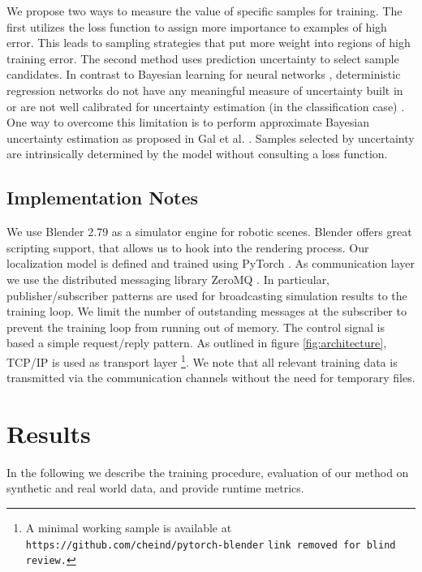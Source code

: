 \documentclass[conference]{IEEEtran}
\begin{document}
    We propose two ways to measure the value of specific samples for training. The first utilizes the loss function to assign more importance to examples of high error. This leads to sampling strategies that put more weight into regions of high training error. The second method uses prediction uncertainty to select sample candidates. In contrast to Bayesian learning for neural networks \cite{neal2012bayesian}, deterministic regression networks do not have any meaningful measure of uncertainty built in or are not well calibrated for uncertainty estimation (in the classification case) \cite{guo2017calibration}. One way to overcome this limitation is to perform approximate Bayesian uncertainty estimation as proposed in Gal et al. \cite{gal2015dropout}. Samples selected by uncertainty are intrinsically determined by the model without consulting a loss function.
    

\subsection{Implementation Notes}
    \label{sec:impl}
    We use Blender 2.79 \cite{blender} as a simulator engine for robotic scenes. Blender offers great scripting support, that allows us to hook into the rendering process. Our localization model is defined and trained using PyTorch \cite{paszke2017automatic}. As communication layer we use the distributed messaging library ZeroMQ \cite{zeromq_guide}. In particular, publisher/subscriber patterns are used for broadcasting simulation results to the training loop. We limit the number of outstanding messages at the subscriber to prevent the training loop from running out of memory. The control signal is based a simple request/reply pattern. As outlined in figure \ref{fig:architecture}, TCP/IP is used as transport layer \footnote{A minimal working sample is available at \iffinalcopy \texttt{https://github.com/cheind/pytorch-blender} \else \texttt{link removed for blind review.} \fi}. We note that all relevant training data is transmitted via the communication channels without the need for temporary files.

\section{Results}

    In the following we describe the training procedure, evaluation of our method on synthetic and real world data, and provide runtime metrics.
\end{document}
